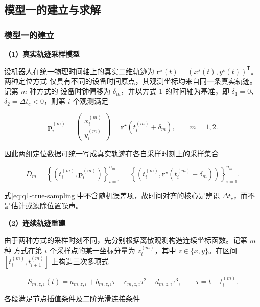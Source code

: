 \subsection{模型一的建立与求解}\label{sec:model-q1}

\subsubsection{模型一的建立}\label{sec:q1-establishment}

\noindent\textbf{（1）真实轨迹采样模型}

设机器人在统一物理时间轴上的真实二维轨迹为
\(\mathbf r^{\star}(t)=(x^{\star}(t),y^{\star}(t))^{\mathsf T}\)。两种定位方式
仅具有不同的设备时间原点，其观测坐标均来自同一条真实轨迹。记第 \(m\) 种方式的
设备时钟偏移为 \(\delta_m\)，并以方式 1 的时间轴为基准，即
\(\delta_1=0\)、\(\delta_2=\Delta t_c<0\)，则第 \(i\) 个观测满足

\begin{equation}
\mathbf p_i^{(m)}=
\begin{pmatrix}x_i^{(m)}\\y_i^{(m)}\end{pmatrix}
=\mathbf r^{\star}\!\left(t_i^{(m)}+\delta_m\right),
\qquad m=1,2.
\label{eq:q1-true-sampling}
\end{equation}

因此两组定位数据可统一写成真实轨迹在各自采样时刻上的采样集合

\begin{equation}
D_m=\left\{\left(t_i^{(m)},\mathbf p_i^{(m)}\right)\right\}_{i=1}^{n_m}
=\left\{\left(t_i^{(m)},
\mathbf r^{\star}(t_i^{(m)}+\delta_m)\right)\right\}_{i=1}^{n_m}.
\label{eq:q1-sampling-set}
\end{equation}

式\eqref{eq:q1-true-sampling}中不含随机误差项，故时间对齐的核心是辨识
\(\Delta t_c\)，而不是估计或滤除位置噪声。

\noindent\textbf{（2）连续轨迹重建}

由于两种方式的采样时刻不同，先分别根据离散观测构造连续坐标函数。记第 \(m\) 种
方式在第 \(i\) 个采样点的某一坐标分量为 \(z_i^{(m)}\)，其中
\(z\in\{x,y\}\)。在区间 \([t_i^{(m)},t_{i+1}^{(m)}]\) 上构造三次多项式

\begin{equation}
S_{m,z,i}(t)=a_{m,z,i}+b_{m,z,i}\tau+c_{m,z,i}\tau^2+d_{m,z,i}\tau^3,
\qquad \tau=t-t_i^{(m)}.
\label{eq:q1-spline-piece}
\end{equation}

各段满足节点插值条件及二阶光滑连接条件

